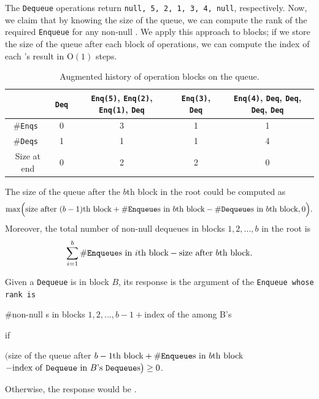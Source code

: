 \noindent The \texttt{Dequeue} operations return \texttt{null, 5, 2,
  1, 3, 4, null}, respectively. 
Now, we claim that by knowing the size of the queue, we can compute
the rank of the required \texttt{Enqueue} for any non-null
. We apply this approach to blocks; if we store the size
of the queue after each block of operations, we can compute the index
of each 's result in \textsc{O}$(1)$ steps. 

\begin{table}[hbtp]
\centering
\begin{small}
  \begin{tabular}{c|c|c|c|c}
    \hline &\texttt{Deq} & \texttt{Enq(5)}, \texttt{Enq(2)}, \texttt{Enq(1)}, \texttt{Deq}& \texttt{Enq(3)}, \texttt{Deq}&  \texttt{Enq(4)}, \texttt{Deq}, \texttt{Deq}, \texttt{Deq}, \texttt{Deq}\\ \hline
    \#\tt{Enq}s & 0 & 3 & 1 & 1 \\ \hline
    \#\tt{Deq}s & 1 & 1 & 1 & 4 \\ \hline
    Size at end & 0 & 2 & 2 & 0 \\ \hline
  \end{tabular}
\end{small}
  \caption{Augmented history of operation blocks on the queue.}
\end{table}

\noindent The size of the queue after the $b$th block in the root
could be computed as 
$$\textrm{max}\Big(\textrm{size after }(b-1)\textrm{th block} +
\#\textrm{\tt{Enqueue}s in }b\textrm{th block} -
\#\textrm{\tt{Dequeue}s in }b\textrm{th block}, 0\Big).$$ 
\noindent Moreover, the total number of non-null dequeues in blocks
$1,2,...,b$ in the root is 
$$ \sum_{i=1}^{b} \#\textrm{\tt{Enqueue}s in }i\textrm{th block} -
\textrm{size after }b\textrm{th block}.$$ 

Given a \texttt{Dequeue} is in block $B$, its response is the argument
of the \tt{Enqueue} whose rank is 
\begin{center}
    \#\textrm{non-null } s in  blocks $1,2,...,b-1 +  $index of the  among B\textrm{'s} 
\end{center}
if \vspace{-3em}
\begin{center}
    $\big ($size of the queue after $b-1\textrm{th block} + \#\textrm{\tt{Enqueue}s in }b\textrm{th block} $\\$- \textrm{index of \tt{Dequeue} in }B\textrm{'s \tt{Dequeue}s} \big )\geq 0$.
\end{center}
Otherwise, the response would be .


